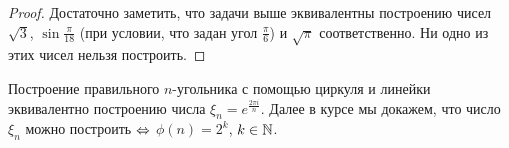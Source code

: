 \begin{proof}
	Достаточно заметить, что задачи выше эквивалентны построению чисел $\sqrt{3}$, $\sin\frac{\pi}{18}$ (при условии, что задан угол $\frac{\pi}{6}$) и $\sqrt\pi$ соответственно. Ни одно из этих чисел нельзя построить.
\end{proof}

\begin{note}
	Построение правильного $n$-угольника с помощью циркуля и линейки эквивалентно построению числа $\xi_n = e^{\frac{2\pi i}{n}}$. Далее в курсе мы докажем, что число $\xi_n$ можно построить $\Leftrightarrow$ $\phi(n) = 2^k$, $k \in \mathbb{N}$.
\end{note}